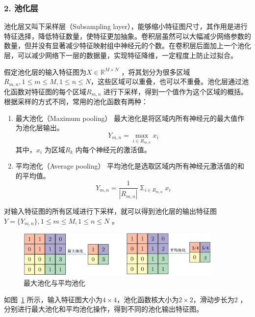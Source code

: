 \subsubsection*{2. 池化层}
\label{subsec:chap02-2-1-2}
池化层又叫下采样层（Subsampling layer），能够缩小特征图尺寸，其作用是进行特征选择，降低特征数量，使特征更加抽象。卷积层虽然可以大幅减少网络参数的数量，但并没有显著减少特征映射组中神经元的个数。在卷积层后面加上一个池化层，可以减少网络下一层的数据量，实现特征降维，一定程度上防止过拟合。

假定池化层的输入特征图为$X \in \mathbb{R}^{M \times N}$ ，将其划分为很多区域$R_{m,n},1 \leq m \leq M, 1 \leq n \leq N$，这些区域可以重叠，也可以不重叠。池化层通过池化函数对特征图的每个区域$R_{m,n}$ 进行下采样，得到一个值作为这个区域的概括。根据采样的方式不同，常用的池化函数有两种：
\begin{enumerate}[1. ]
  \label{list:1}
  \item 最大池化（Maximum pooling）
        最大池化是将区域内所有神经元的最大值作为池化层输出。
        \begin{equation}
          \label{eq:2-18}
          Y_{m,n} = \mathop{\max}_{i \in R_{m,n}} x_i
        \end{equation}
        其中，$x_i$ 为区域$R_k$ 内每个神经元的激活值。

  \item 平均池化（Average pooling）
        平均池化是选取区域内所有神经元激活值的和的平均值。
        \begin{equation}
          \label{eq:2-19}
          Y_{m,n} =  \frac{1}{|R_{m,n}|}\mathbb{\sum}_{i \in R_{m,n}} x_i
        \end{equation}
\end{enumerate}
对输入特征图的所有区域进行下采样，就可以得到池化层的输出特征图$Y = \{ Y_{m,n}\},1 \leq m \leq M, 1 \leq n \leq N$ 。

\begin{figure}[htbp]
  \centering
  \includegraphics[width=0.9\textwidth]{figures/pooling}
  \caption{最大池化与平均池化}\label{fig:pooling}
\end{figure}

如图~\ref{fig:pooling} 所示，输入特征图大小为$4 \times 4$，池化函数核大小为$2 \times 2$，滑动步长为$2$ ，分别进行最大池化和平均池化操作，得到不同的池化输出特征图。

